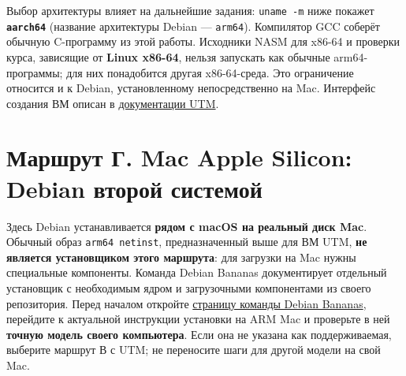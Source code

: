 Выбор архитектуры влияет на дальнейшие задания: \texttt{uname\ -m} ниже
покажет \textbf{\texttt{aarch64}} (название архитектуры Debian ---
\texttt{arm64}). Компилятор GCC соберёт обычную C-программу из этой
работы. Исходники NASM для x86-64 и проверки курса, зависящие от
\textbf{Linux x86-64}, нельзя запускать как обычные arm64-программы; для
них понадобится другая x86-64-среда. Это ограничение относится и к
Debian, установленному непосредственно на Mac. Интерфейс создания ВМ
описан в \href{https://docs.getutm.app/basics/basics/}{документации
UTM}.

\hypertarget{ux43cux430ux440ux448ux440ux443ux442-ux433-mac-apple-silicon-debian-ux432ux442ux43eux440ux43eux439-ux441ux438ux441ux442ux435ux43cux43eux439}{%
\section{Маршрут Г. Mac Apple Silicon: Debian второй
системой}\label{ux43cux430ux440ux448ux440ux443ux442-ux433-mac-apple-silicon-debian-ux432ux442ux43eux440ux43eux439-ux441ux438ux441ux442ux435ux43cux43eux439}}

Здесь Debian устанавливается \textbf{рядом с macOS на реальный диск
Mac}. Обычный образ \texttt{arm64\ netinst}, предназначенный выше для ВМ
UTM, \textbf{не является установщиком этого маршрута}: для загрузки на
Mac нужны специальные компоненты. Команда Debian Bananas документирует
отдельный установщик с необходимым ядром и загрузочными компонентами из
своего репозитория. Перед началом откройте
\href{https://wiki.debian.org/Teams/Bananas}{страницу команды Debian
Bananas}, перейдите к актуальной инструкции установки на ARM Mac и
проверьте в ней \textbf{точную модель своего компьютера}. Если она не
указана как поддерживаемая, выберите маршрут В с UTM; не переносите шаги
для другой модели на свой Mac.

